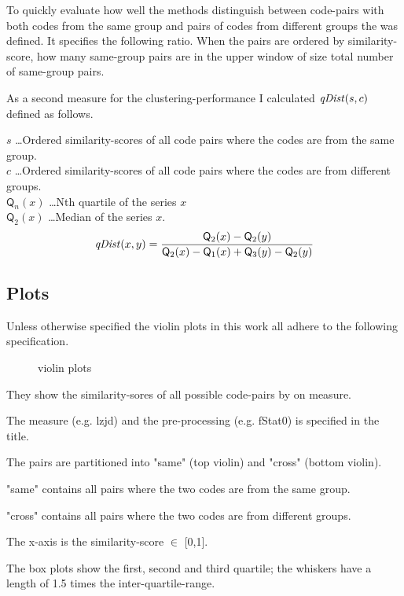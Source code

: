 \documentclass[../main.tex]{subfiles}
\begin{document}
To quickly evaluate how well the methods distinguish between code-pairs with both codes from the same group and pairs of codes from different groups the  was defined.
It specifies the following ratio.
When the pairs are ordered by similarity-score, how many same-group pairs are in the upper window of size total number of same-group pairs.

As a second measure for the clustering-performance I calculated $\mbox{\textit{qDist}}(s,c)$ defined as follows.

$s$ \dots Ordered similarity-scores of all code pairs where the codes are from the same group.\\
$c$ \dots Ordered similarity-scores of all code pairs where the codes are from different groups.\\
$\mathsf{Q}_n(x)$ \dots Nth quartile of the series $x$\\
$\mathsf{Q}_2(x)$ \dots Median of the series $x$.
\begin{equation}
  \mbox{\textit{qDist}}(x,y) = \dfrac{\mathsf{Q}_2(x) - \mathsf{Q}_2(y)}{\mathsf{Q}_2(x) - \mathsf{Q}_1(x) + \mathsf{Q}_3(y) - \mathsf{Q}_2(y)}
  \label{eq:qDist}
\end{equation}

\subsection{Plots}

Unless otherwise specified the violin plots  in this work all adhere to the following specification.

\begin{figure}[ht!]
  \centering

  \caption{violin plots}
  \label{fig:violins}
\end{figure}

\begin{ul}
  \item They show the similarity-sores of all possible code-pairs by on measure.
  \item The measure (e.g. lzjd) and the pre-processing (e.g. fStat0) is specified in the title.
  \item The pairs are partitioned into "same" (top violin) and "cross" (bottom violin).
  \item "same" contains all pairs where the two codes are from the same group.
  \item "cross" contains all pairs where the two codes are from different groups.
  \item The x-axis is the similarity-score $\in$ [0,1].
  \item The box plots show the first, second and third quartile; the whiskers have a length of 1.5 times the inter-quartile-range.
\end{ul}
\end{document}
